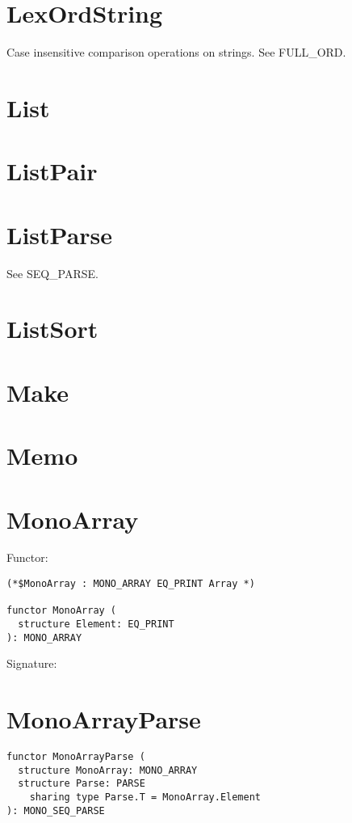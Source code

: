 \section{LexOrdString}
Case insensitive comparison operations on strings.  See FULL\_ORD.

\newpage
\section{List}


\newpage
\section{ListPair}


\newpage
\section{ListParse}
See SEQ\_PARSE.

\newpage
\section{ListSort}


\newpage
\section{Make}


\newpage
\section{Memo}


\newpage
\section{MonoArray}
Functor:
\begin{verbatim}
(*$MonoArray : MONO_ARRAY EQ_PRINT Array *)

functor MonoArray (
  structure Element: EQ_PRINT
): MONO_ARRAY
\end{verbatim}
\bigskip
Signature:


\newpage
\section{MonoArrayParse}
\begin{verbatim}
functor MonoArrayParse (
  structure MonoArray: MONO_ARRAY
  structure Parse: PARSE
    sharing type Parse.T = MonoArray.Element
): MONO_SEQ_PARSE
\end{verbatim}

